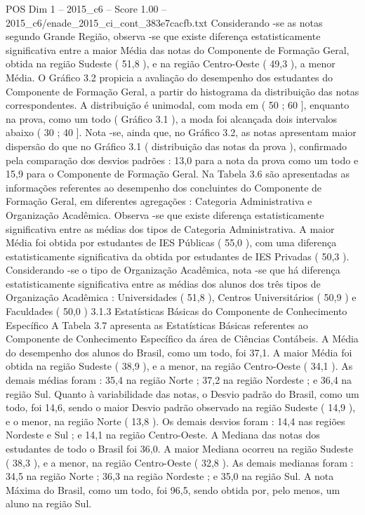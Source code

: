 \begin{textsample}{POS Dim 1 – 2015\_c6 – Score 1.00 – 2015\_c6/enade\_2015\_ci\_cont\_383e7cacfb.txt}
Considerando -se as notas segundo Grande Região, observa -se que existe diferença estatisticamente significativa entre a maior Média das notas do Componente de Formação Geral, obtida na região Sudeste ( 51,8 ), e na região Centro-Oeste ( 49,3 ), a menor Média.
O Gráfico 3.2 propicia a avaliação do desempenho dos estudantes do Componente de Formação Geral, a partir do histograma da distribuição das notas correspondentes.
A distribuição é unimodal, com moda em ( 50 ; 60 ], enquanto na prova, como um todo ( Gráfico 3.1 ), a moda foi alcançada dois intervalos abaixo ( 30 ; 40 ].
Nota -se, ainda que, no Gráfico 3.2, as notas apresentam maior dispersão do que no Gráfico 3.1 ( distribuição das notas da prova ), confirmado pela comparação dos desvios padrões : 13,0 para a nota da prova como um todo e 15,9 para o Componente de Formação Geral.
Na Tabela 3.6 são apresentadas as informações referentes ao desempenho dos concluintes do Componente de Formação Geral, em diferentes agregações : Categoria Administrativa e Organização Acadêmica.
Observa -se que existe diferença estatisticamente significativa entre as médias dos tipos de Categoria Administrativa.
A maior Média foi obtida por estudantes de IES Públicas ( 55,0 ), com uma diferença estatisticamente significativa da obtida por estudantes de IES Privadas ( 50,3 ).
Considerando -se o tipo de Organização Acadêmica, nota -se que há diferença estatisticamente significativa entre as médias dos alunos dos três tipos de Organização Acadêmica : Universidades ( 51,8 ), Centros Universitários ( 50,9 ) e Faculdades ( 50,0 ) 3.1.3 Estatísticas Básicas do Componente de Conhecimento Específico A Tabela 3.7 apresenta as Estatísticas Básicas referentes ao Componente de Conhecimento Específico da área de Ciências Contábeis.
A Média do desempenho dos alunos do Brasil, como um todo, foi 37,1.
A maior Média foi obtida na região Sudeste ( 38,9 ), e a menor, na região Centro-Oeste ( 34,1 ).
As demais médias foram : 35,4 na região Norte ; 37,2 na região Nordeste ; e 36,4 na região Sul.
Quanto à variabilidade das notas, o Desvio padrão do Brasil, como um todo, foi 14,6, sendo o maior Desvio padrão observado na região Sudeste ( 14,9 ), e o menor, na região Norte ( 13,8 ).
Os demais desvios foram : 14,4 nas regiões Nordeste e Sul ; e 14,1 na região Centro-Oeste.
A Mediana das notas dos estudantes de todo o Brasil foi 36,0.
A maior Mediana ocorreu na região Sudeste ( 38,3 ), e a menor, na região Centro-Oeste ( 32,8 ).
As demais medianas foram : 34,5 na região Norte ; 36,3 na região Nordeste ; e 35,0 na região Sul.
A nota Máxima do Brasil, como um todo, foi 96,5, sendo obtida por, pelo menos, um aluno na região Sul.

\end{textsample}
